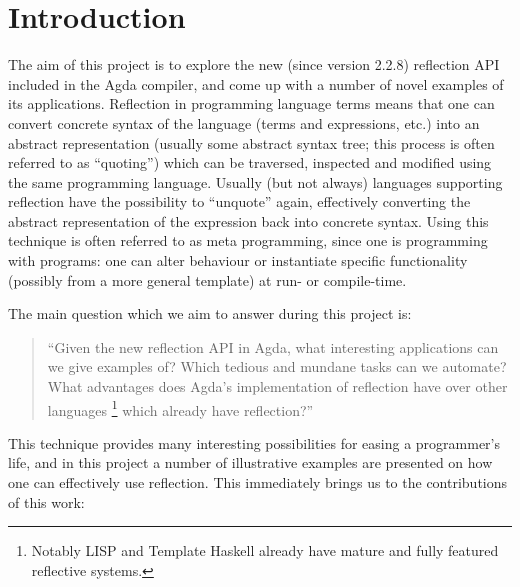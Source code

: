 \section{Introduction}

The aim of this project is to explore the new (since version 2.2.8) reflection API included in the Agda
compiler, and come up with a number of novel examples of its applications. Reflection in programming language
terms means that one can convert concrete syntax of the language (terms and expressions, etc.) into an abstract
representation (usually some abstract syntax tree; this process is often referred to as ``quoting'')
which can be traversed, inspected and modified using the same programming
language. Usually (but not always) languages supporting reflection have the possibility to
``unquote'' again, effectively
converting the abstract representation of the expression back into concrete syntax. Using this technique is often referred to as meta programming,
since one is programming with programs: one can alter behaviour
or instantiate specific functionality (possibly from a more general template) at run- or compile-time.

The main question which we aim to answer during this project is:


\begin{quote}
``Given the new reflection API in Agda, what interesting applications can we give
examples of? Which tedious and mundane tasks can we automate? What advantages does
Agda's implementation of reflection have over other languages
\footnote{Notably LISP and Template Haskell already have mature and fully featured reflective systems.} which already have reflection?''
\end{quote}


This technique provides many interesting possibilities for easing a programmer's life, and in
this project a number of illustrative
examples are presented on how one can effectively use reflection.
This immediately brings us to the contributions of this work:

